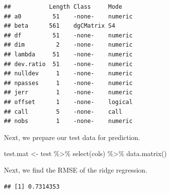 \documentclass[
]{book}
\newenvironment{Shaded}{\begin{snugshade}}{\end{snugshade}}
\newcommand{\AttributeTok}[1]{\textcolor[rgb]{0.77,0.63,0.00}{#1}}
\newcommand{\FloatTok}[1]{\textcolor[rgb]{0.00,0.00,0.81}{#1}}
\newcommand{\FunctionTok}[1]{\textcolor[rgb]{0.00,0.00,0.00}{#1}}
\newcommand{\NormalTok}[1]{#1}
\newcommand{\OtherTok}[1]{\textcolor[rgb]{0.56,0.35,0.01}{#1}}
\newcommand{\SpecialCharTok}[1]{\textcolor[rgb]{0.00,0.00,0.00}{#1}}
\begin{document}
\begin{verbatim}
##           Length Class     Mode   
## a0         51    -none-    numeric
## beta      561    dgCMatrix S4     
## df         51    -none-    numeric
## dim         2    -none-    numeric
## lambda     51    -none-    numeric
## dev.ratio  51    -none-    numeric
## nulldev     1    -none-    numeric
## npasses     1    -none-    numeric
## jerr        1    -none-    numeric
## offset      1    -none-    logical
## call        5    -none-    call   
## nobs        1    -none-    numeric
\end{verbatim}

Next, we prepare our test data for prediction.

\begin{Shaded}
\begin{Highlighting}[]
\NormalTok{test.mat }\OtherTok{\textless{}{-}}\NormalTok{ test }\SpecialCharTok{\%\textgreater{}\%} \FunctionTok{select}\NormalTok{(cols) }\SpecialCharTok{\%\textgreater{}\%} \FunctionTok{data.matrix}\NormalTok{()}
\end{Highlighting}
\end{Shaded}

Next, we find the RMSE of the ridge regression.

\begin{Shaded}
\end{Shaded}

\begin{verbatim}
## [1] 0.7314353
\end{verbatim}

\begin{Shaded}
\end{Shaded}
\end{document}
